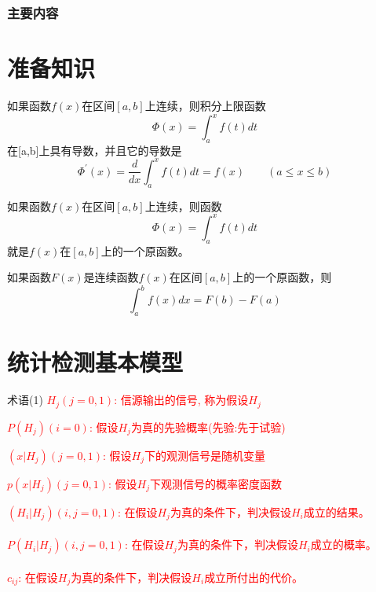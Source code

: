 \begin{frame}
  \frametitle{主要内容}
  \tableofcontents[hideallsubsections]
\end{frame}

\section{准备知识}
\begin{frame}
\begin{theorem}
	如果函数$f(x)$在区间$[a,b]$上连续，则积分上限函数
	\[\Phi(x)=\int_a^x f(t)dt\]
	在[a,b]上具有导数，并且它的导数是
	\[\Phi^\prime(x)=\frac{d}{dx}\int_a^xf(t)dt=f(x)\qquad (a\le x\le b) \]
\end{theorem}
\begin{theorem}
	如果函数$f(x)$在区间$[a,b]$上连续，则函数
	\[\Phi(x)=\int_a^x f(t)dt\]	
	就是$f(x)$在$[a,b]$上的一个原函数。
\end{theorem}
\end{frame}

\begin{frame}
\begin{theorem}
	如果函数$F(x)$是连续函数$f(x)$在区间$[a,b]$上的一个原函数，则
	\[\int_a^b f(x)dx=F(b)-F(a)\]	
\end{theorem}
\end{frame}

\section{统计检测基本模型}

\begin{frame}{术语(1)}
\textcolor{red}{$H_j(j=0,1)$: 信源输出的信号, 称为假设$H_j$}

\bigskip

\textcolor{red}{$P(H_j)(i=0)$: 假设$H_j$为真的先验概率(先验:先于试验)}


\bigskip
\textcolor{red}{$(x|H_j)(j=0,1)$: 假设$H_j$下的观测信号是随机变量}

\bigskip

\textcolor{red}{$p(x|H_j)(j=0,1)$: 假设$H_j$下观测信号的概率密度函数}

\bigskip

\textcolor{red}{$(H_i|H_j)(i,j=0,1)$: 在假设$H_j$为真的条件下，判决假设$H_i$成立的结果。}\\
~\\
\textcolor{red}{$P(H_i|H_j)(i,j=0,1)$: 在假设$H_j$为真的条件下，判决假设$H_i$成立的概率。}\\
~\\
\textcolor{red}{$c_{ij}$: 在假设$H_j$为真的条件下，判决假设$H_i$成立所付出的代价。}
\end{frame}

